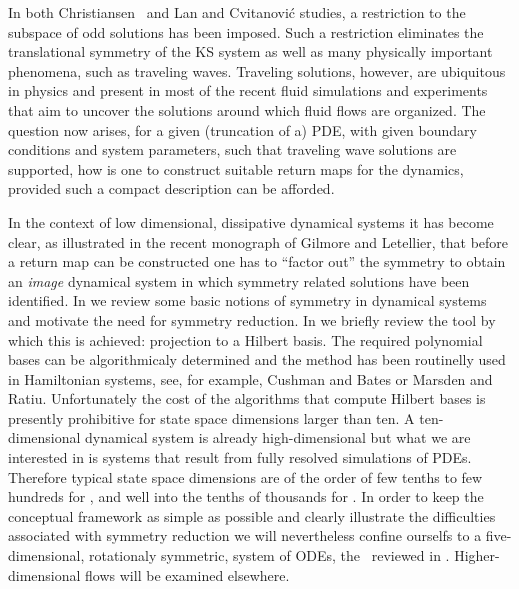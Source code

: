 In both Christiansen \etal\ and Lan and Cvitanovi\'{c} studies, a restriction to the 
subspace of odd solutions has been imposed. Such a restriction eliminates the translational 
symmetry of the KS system as well as many physically important phenomena, such as
traveling waves. Traveling solutions, however, are ubiquitous in physics and present 
in most of the recent fluid simulations 
and experiments 
that aim to uncover the solutions around which fluid flows are organized.
The question now arises, for a given (truncation of a) PDE, with
given boundary conditions and system parameters, such that
traveling wave solutions are supported, how is one to construct suitable return maps
for the dynamics, provided such a compact description can be afforded. 

In the context of low dimensional, dissipative dynamical systems it has become clear, as illustrated
in the recent monograph of Gilmore and Letellier, that before a return
map can be constructed one has to ``factor out'' the symmetry to obtain an \emph{image}
dynamical system in which symmetry related solutions have been identified. In  we
review some basic notions of symmetry in dynamical systems and motivate the need for symmetry 
reduction. In  we briefly review the tool by which this is achieved: projection 
to a Hilbert basis. The required polynomial bases can be algorithmicaly determined
and the method has been routinelly used in Hamiltonian systems, see, for example, 
Cushman and Bates or Marsden and Ratiu. 
Unfortunately the cost of the algorithms that compute Hilbert bases is presently prohibitive 
for state space dimensions larger than ten. A ten-dimensional dynamical system is already high-dimensional
but what we are interested in is systems that result from fully resolved simulations of PDEs.
Therefore typical state space dimensions are of the order of few tenths to few hundreds for \KSe, and
well into the tenths of thousands for \PCf. In order to keep the conceptual framework as simple as possible
and clearly illustrate the difficulties associated with symmetry reduction 
we will nevertheless confine ourselfs to a five-dimensional, rotationaly symmetric, 
system of ODEs, the \CLe\ reviewed in . Higher-dimensional flows will
be examined elsewhere.

